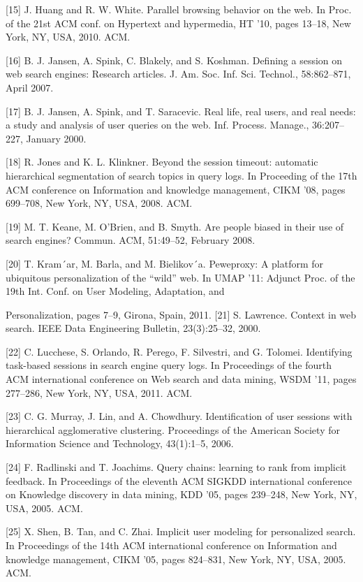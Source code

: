 \documentclass{acm_proc_article-sp} %
\begin{document}
[15] J. Huang and R. W. White. Parallel browsing
behavior on the web. In Proc. of the 21st ACM conf.
on Hypertext and hypermedia, HT ’10, pages 13–18,
New York, NY, USA, 2010. ACM.

[16] B. J. Jansen, A. Spink, C. Blakely, and S. Koshman.
Defining a session on web search engines: Research
articles. J. Am. Soc. Inf. Sci. Technol., 58:862–871,
April 2007.

[17] B. J. Jansen, A. Spink, and T. Saracevic. Real life,
real users, and real needs: a study and analysis of user
queries on the web. Inf. Process. Manage., 36:207–227,
January 2000.

[18] R. Jones and K. L. Klinkner. Beyond the session
timeout: automatic hierarchical segmentation of
search topics in query logs. In Proceeding of the 17th
ACM conference on Information and knowledge
management, CIKM ’08, pages 699–708, New York,
NY, USA, 2008. ACM.

[19] M. T. Keane, M. O’Brien, and B. Smyth. Are people
biased in their use of search engines? Commun. ACM,
51:49–52, February 2008.

[20] T. Kram´ar, M. Barla, and M. Bielikov´a. Peweproxy:
A platform for ubiquitous personalization of the “wild”
web. In UMAP ’11: Adjunct Proc. of the 19th Int.
Conf. on User Modeling, Adaptation, and

Personalization, pages 7–9, Girona, Spain, 2011.
[21] S. Lawrence. Context in web search. IEEE Data
Engineering Bulletin, 23(3):25–32, 2000.

[22] C. Lucchese, S. Orlando, R. Perego, F. Silvestri, and
G. Tolomei. Identifying task-based sessions in search
engine query logs. In Proceedings of the fourth ACM
international conference on Web search and data
mining, WSDM ’11, pages 277–286, New York, NY,
USA, 2011. ACM.

[23] C. G. Murray, J. Lin, and A. Chowdhury.
Identification of user sessions with hierarchical
agglomerative clustering. Proceedings of the American
Society for Information Science and Technology,
43(1):1–5, 2006.

[24] F. Radlinski and T. Joachims. Query chains: learning
to rank from implicit feedback. In Proceedings of the
eleventh ACM SIGKDD international conference on
Knowledge discovery in data mining, KDD ’05, pages
239–248, New York, NY, USA, 2005. ACM.

[25] X. Shen, B. Tan, and C. Zhai. Implicit user modeling
for personalized search. In Proceedings of the 14th
ACM international conference on Information and
knowledge management, CIKM ’05, pages 824–831,
New York, NY, USA, 2005. ACM.
\end{document}
